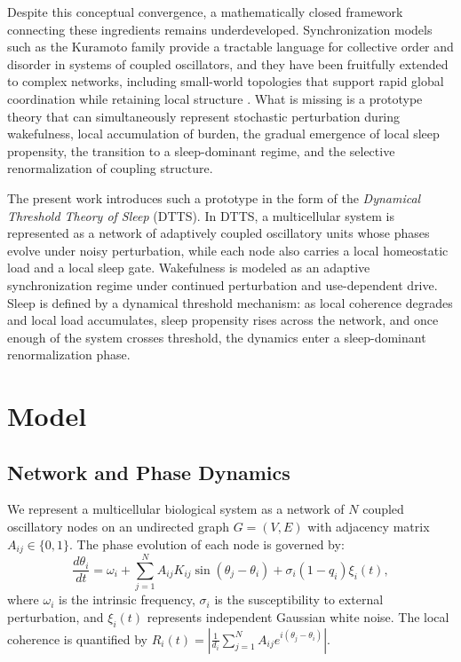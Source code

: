 \documentclass[12pt]{article}
\begin{document}
Despite this conceptual convergence, a mathematically closed framework connecting these ingredients remains underdeveloped. Synchronization models such as the Kuramoto family provide a tractable language for collective order and disorder in systems of coupled oscillators, and they have been fruitfully extended to complex networks, including small-world topologies that support rapid global coordination while retaining local structure \cite{Acebron2005, Hong2002}. What is missing is a prototype theory that can simultaneously represent stochastic perturbation during wakefulness, local accumulation of burden, the gradual emergence of local sleep propensity, the transition to a sleep-dominant regime, and the selective renormalization of coupling structure.

The present work introduces such a prototype in the form of the \emph{Dynamical Threshold Theory of Sleep} (DTTS). In DTTS, a multicellular system is represented as a network of adaptively coupled oscillatory units whose phases evolve under noisy perturbation, while each node also carries a local homeostatic load and a local sleep gate. Wakefulness is modeled as an adaptive synchronization regime under continued perturbation and use-dependent drive. Sleep is defined by a dynamical threshold mechanism: as local coherence degrades and local load accumulates, sleep propensity rises across the network, and once enough of the system crosses threshold, the dynamics enter a sleep-dominant renormalization phase.

\section{Model}

\subsection{Network and Phase Dynamics}
We represent a multicellular biological system as a network of $N$ coupled oscillatory nodes on an undirected graph $G=(V,E)$ with adjacency matrix $A_{ij} \in \{0,1\}$. The phase evolution of each node is governed by:
\begin{equation}
    \frac{d\theta_i}{dt} = \omega_i + \sum_{j=1}^{N} A_{ij} K_{ij} \sin(\theta_j - \theta_i) + \sigma_i (1 - q_i) \xi_i(t),
\end{equation}
where $\omega_i$ is the intrinsic frequency, $\sigma_i$ is the susceptibility to external perturbation, and $\xi_i(t)$ represents independent Gaussian white noise. The local coherence is quantified by $R_i(t) = | \frac{1}{d_i} \sum_{j=1}^{N} A_{ij} e^{i(\theta_j - \theta_i)} |$.
\end{document}
